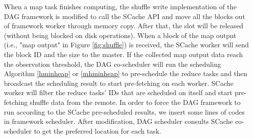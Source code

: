 When a map task finishes computing, the shuffle write implementation of the DAG framework is modified to call the SCache API and move all the blocks out of {\color{blue}framework worker} through memory copy. 
After that, the slot will be released (without being blocked on disk operations).
When a block of the map output (i.e., "map output" in Figure \ref{fig:shuffle}) is received, the SCache worker will send the block ID and the size to the master.
If the collected map output data reach the observation threshold, the DAG co-scheduler will run the scheduling Algorithm \ref{hminheap} or \ref{mhminheap} to pre-schedule the reduce tasks and then broadcast the scheduling result to start pre-fetching on each worker.
SCache worker will filter the reduce tasks' IDs that are scheduled on itself and start pre-fetching shuffle data from the remote. 
{\color{blue}
In order to force the DAG framework to run according to the SCache pre-scheduled results, we insert some lines of codes in framework scheduler.
After modification, DAG scheduler consults SCache co-scheduler to get the preferred location for each task.
}

